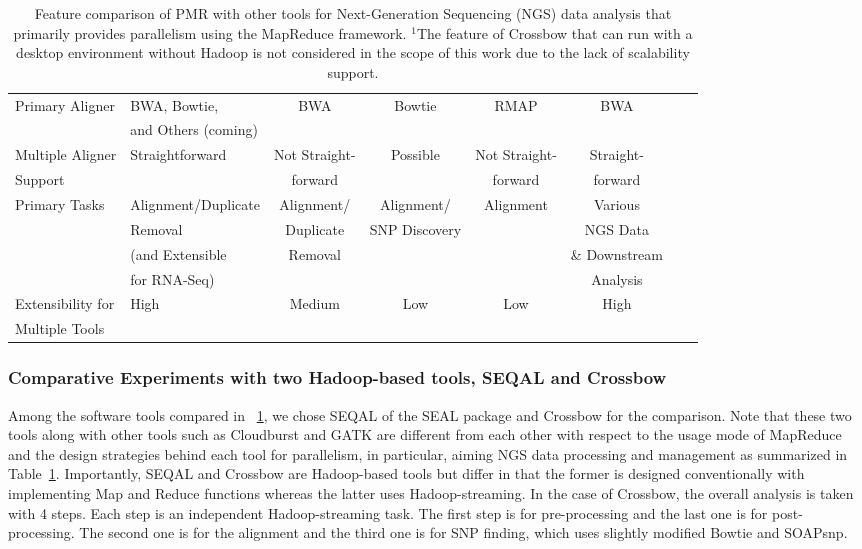 \documentclass{sig-alternate}
\begin{document}
\begin{center}
\begin{table}[ht]
{\begin{tabular}{|l|l|c|c|c|c|c|c|}
Primary Aligner &  BWA, Bowtie,  &  BWA & Bowtie & RMAP &  BWA \\
& and Others (coming) &  &  &  &  \\ \hline
Multiple Aligner  & Straightforward & Not Straight- & Possible & Not Straight-  & Straight-  \\ 
Support &  & forward &   & forward  & forward \\\hline
Primary Tasks & Alignment/Duplicate  & Alignment/ & Alignment/ & Alignment &Various\\
  &  Removal & Duplicate & SNP Discovery & & NGS Data  \\  
           & (and Extensible &  Removal & &  & \& Downstream  \\
           & for RNA-Seq) & & &  & Analysis \\ \hline  
Extensibility for   &  High  & Medium &  Low & Low & High      \\
Multiple Tools  &      &  &  &  &   \\ \hline

\hline
\end{tabular}}
\hfill{}
\caption{Feature comparison of PMR with other tools for Next-Generation Sequencing (NGS) data analysis that primarily provides parallelism using the MapReduce framework.  $^{1}${The feature of Crossbow that can run with a desktop environment without Hadoop is not considered in the scope of this work due to the lack of scalability support.} }
 \label{table:mr-comparison}
\end{table}
\end{center}

\subsubsection{Comparative Experiments with two Hadoop-based tools, SEQAL and Crossbow}
Among the software tools compared in ~\ref{table:mr-comparison}, we chose SEQAL of the SEAL package and Crossbow for the comparison.  Note that these two tools along with other tools such as Cloudburst and GATK are different from each other with respect to the usage mode of MapReduce and the design strategies behind each tool for parallelism, in particular, aiming NGS data processing and management as summarized in Table~\ref{table:mr-comparison}.  Importantly, SEQAL and Crossbow are Hadoop-based tools but differ in that the former is designed conventionally with implementing Map and Reduce functions whereas the latter uses Hadoop-streaming.  In the case of Crossbow, the overall analysis is taken with 4 steps.  Each step is an independent Hadoop-streaming task.  The first step is for pre-processing and the last one is for post-processing. The second one is for the alignment and the third one is for SNP finding, which uses slightly modified Bowtie and SOAPsnp.  
\end{document}
